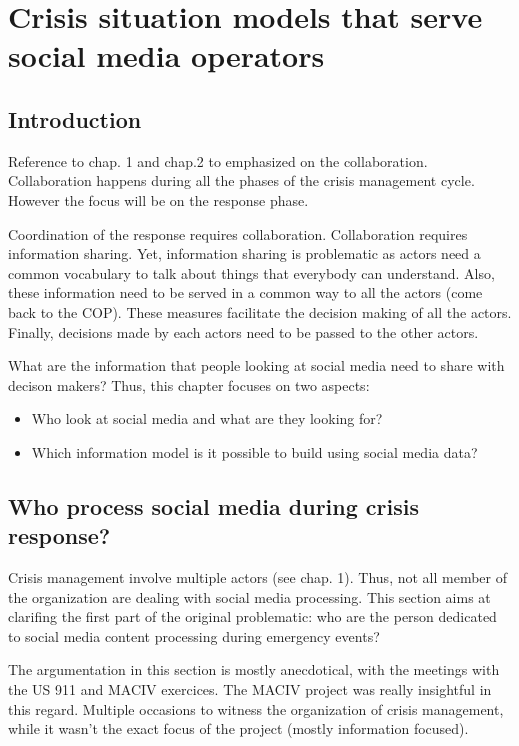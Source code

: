 \chapter{Crisis situation models that serve social media operators}


\section*{Introduction}
Reference to chap. 1 and chap.2 to emphasized on the collaboration.
Collaboration happens during all the phases of the crisis management cycle.
However the focus will be on the response phase.

Coordination of the response requires collaboration.
Collaboration requires information sharing.
Yet, information sharing is problematic as actors need a common vocabulary to talk about things that everybody can understand.
Also, these information need to be served in a common way to all the actors (come back to the COP).
These measures facilitate the decision making of all the actors.
Finally, decisions made by each actors need to be passed to the other actors.

What are the information that people looking at social media need to share with decison makers?
Thus, this chapter focuses on two aspects:
\begin{itemize}
    \item Who look at social media and what are they looking for?
    \item Which information model is it possible to build using social media data?
\end{itemize}

\section{Who process social media during crisis response?}
Crisis management involve multiple actors (see chap. 1).
Thus, not all member of the organization are dealing with social media processing.
This section aims at clarifing the first part of the original problematic: who are the person dedicated to social media content processing during emergency events?

The argumentation in this section is mostly anecdotical, with the meetings with the US 911 and MACIV exercices.
The MACIV project was really insightful in this regard.
Multiple occasions to witness the organization of crisis management, while it wasn't the exact focus of the project (mostly information focused).

